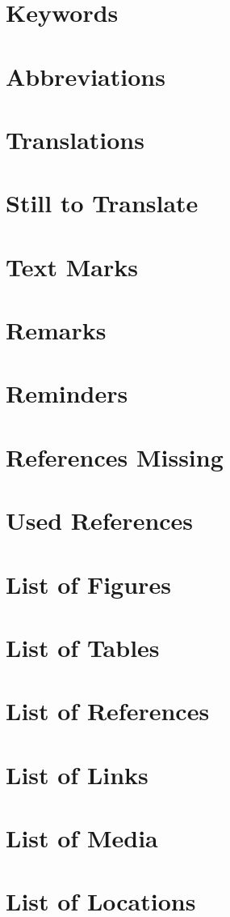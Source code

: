 %
\placeAll%
{%
\section{Keywords}%
\placeRegKeyword%
%
\section{Abbreviations}%
\placelistofRegAbbreviations%
%
\section{Translations}%
\placeTranslationsAll%
%
\section{Still to Translate}%
\placeUndefinedTranslationsAll%
%
\section{Text Marks}%
\placeTextMarksAll%
%
\section{Remarks}%
\placeRemarksAll%
%
\section{Reminders}%
\placeRemindersAll%
%
\section{References Missing}%
\placeMissingReferencesAll%
%
\section{Used References}%
\placeQuotesAll%
%
\placeReferences%
}

\placeReferences%
{%
\section{List of Figures}%
\placelist[figure][criterium=all]%
%
\section{List of Tables}%
\placelist[table][criterium=all]%
%
\section{List of References}%
\showReferences%
%
\section{List of Links}%
\showLinks%
%
\section{List of Media}%
\showMedias%
%
\section{List of Locations}%
\showLocations%
}

\stopenvironment